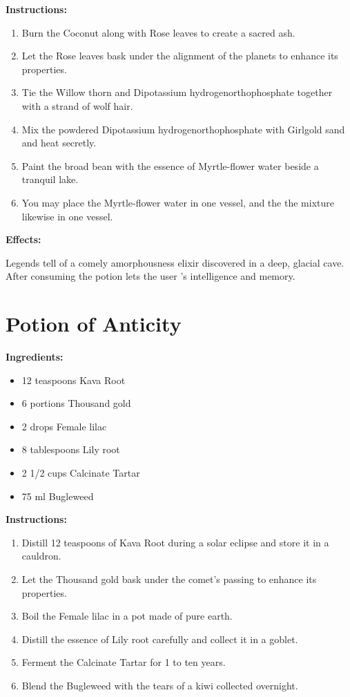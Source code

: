 \documentclass{article}
\begin{document}
\textbf{Instructions:}

\begin{enumerate}
  \item Burn the Coconut along with Rose leaves to create a sacred ash.
  \item Let the Rose leaves bask under the alignment of the planets to enhance its properties.
  \item Tie the Willow thorn and Dipotassium hydrogenorthophosphate together with a strand of wolf hair.
  \item Mix the powdered Dipotassium hydrogenorthophosphate with Girlgold sand and heat secretly.
  \item Paint the broad bean with the essence of Myrtle-flower water beside a tranquil lake.
  \item You may place the Myrtle-flower water in one vessel, and the the mixture likewise in one vessel.
\end{enumerate}

\textbf{Effects:}

Legends tell of a comely amorphousness elixir discovered in a deep, glacial cave. After consuming the potion lets the user 's intelligence and memory.

\newpage
\section*{Potion of Anticity}

\textbf{Ingredients:}

\begin{itemize}
  \item 12 teaspoons Kava Root
  \item 6 portions Thousand gold
  \item 2 drops Female lilac
  \item 8 tablespoons Lily root
  \item 2 1/2 cups Calcinate Tartar
  \item 75 ml Bugleweed
\end{itemize}

\textbf{Instructions:}

\begin{enumerate}
  \item Distill 12 teaspoons of Kava Root during a solar eclipse and store it in a cauldron.
  \item Let the Thousand gold bask under the comet’s passing to enhance its properties.
  \item Boil the Female lilac in a pot made of pure earth.
  \item Distill the essence of Lily root carefully and collect it in a goblet.
  \item Ferment the Calcinate Tartar for 1 to ten years.
  \item Blend the Bugleweed with the tears of a kiwi collected overnight.
\end{enumerate}
\end{document}
